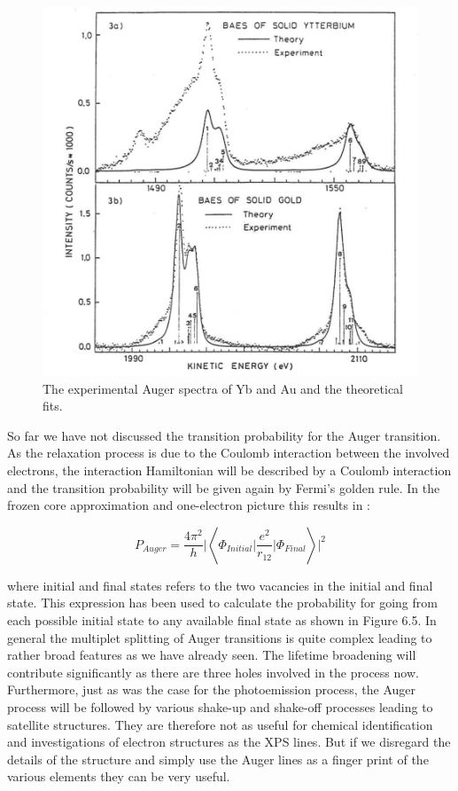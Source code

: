 \begin{figure}[h!]
	\begin{center}
	\includegraphics[scale=4]{figures/06_05.png}
	\caption{The experimental Auger spectra of Yb and Au and the theoretical fits.}
	\label{fig:ybauaes}
	\end{center}
\end{figure}

So far we have not discussed the transition probability for the Auger transition. As the relaxation process is due to the Coulomb interaction between the involved electrons, the interaction Hamiltonian will be described by a Coulomb interaction and the transition probability will be given again by Fermi's golden rule. In the frozen core approximation and one-electron picture this results in \cite{wentzel}:

\begin{equation}
P_{Auger}=\frac{4\pi^2}{h}\vert \left< \Phi_{Initial}\vert \frac{e^2}{r_{12}}\vert \Phi_{Final}\right>\vert ^2
\end{equation}

\noindent where initial and final states refers to the two vacancies in the initial and final state. This expression has been used to calculate the probability for going from each possible initial state to any available final state as shown in Figure 6.5. In general the multiplet splitting of Auger transitions is quite complex leading to rather broad features as we have already seen. The lifetime broadening will contribute significantly as there are three holes involved in the process now. Furthermore, just as was  the case for the photoemission process, the Auger process will be followed by various shake-up and shake-off processes leading to satellite structures. They are therefore not as useful for chemical identification and investigations of electron structures as the XPS lines. But if we disregard the details of the structure and simply use the Auger lines as a finger print of the various elements they can be very useful.

